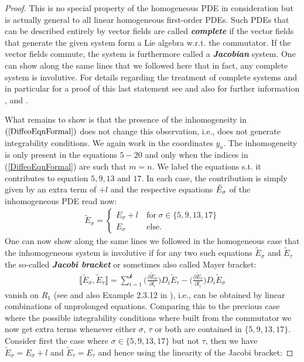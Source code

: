 \begin{proof}
This is no special property of the homogeneous PDE in consideration but is actually general to all linear homogeneous first-order PDEs. Such PDEs that can be described entirely by vector fields are called \textit{\textbf{complete}} if the vector fields that generate the given system form a Lie algebra w.r.t. the commutator. If the vector fields commute, the system is furthermore called a \textit{\textbf{Jacobian}} system. One can show along the same lines that we followed here that in fact, any complete system is involutive. For details regarding the treatment of complete systems and in particular for a proof of this last statement see \cite{seiler1994analysis} and also for further information \cite{Clebsch1866}, \cite{caratheodory1956variationsrechnung} and \cite{lie1970theorie}.

What remains to show is that the presence of the inhomogeneity in $(\ref{DiffeoEqnFormal})$ does not change this observation, i.e., does not generate integrability conditions. We again work in the coordinates $y_a$. The inhomogeneity is only present in the equations $5-20$ and only when the indices in (\ref{DiffeoEqnFormal}) are such that $m = n$. We label the equations s.t. it contributes to equation $5,9,13$ and $17$. In each case, the contribution is simply given by an extra term of $+l$ and the respective equations $\Tilde{E}_{\sigma}$ of the inhomogeneous PDE read now: 
\begin{align}
     \tilde{E}_{\sigma} = \begin{cases}
     E_{\sigma} + l \ &\text{for} \ \sigma \in \{ 5,9,13,17 \}\\
     E_{\sigma} \ &\text{else}.
     \end{cases}
\end{align}
One can now show along the same lines we followed in the homogeneous case that the inhomogeneous system is involutive if for any two such equations $\tilde{E}_{\sigma}$ and $\tilde{E}_{\tau}$ the so-called \textit{\textbf{Jacobi bracket}} or sometimes also called Mayer bracket: 
\begin{align}
  \llbracket \tilde{E}_{\sigma}, \tilde{E}_{\tau} \rrbracket = \sum _{i = 1}^{\mathcal{k}} \biggl(\frac{\partial \tilde{E}_{\sigma}}{\partial l_i}\biggr) D_{i}\tilde{E}_{\tau} -  \biggl(\frac{\partial \tilde{E}_{\tau}}{\partial l_i}\biggr) D_{i}\tilde{E}_{\sigma} 
\end{align}
vanish on $R_1$ (see  \cite{seiler1994analysis} and also Example 2.3.12 in \cite{seiler2009involution}), i.e., can be obtained by linear combinations of unprolonged equations. Comparing this to the previous case where the possible integrability conditions where built from the commutator we now get extra terms whenever either $\sigma$, $\tau$ or both are contained in $\{ 5,9,13,17 \}$. Consider first the case where $\sigma \in \{5,9,13,17\}$ but not $\tau$, then we have $\tilde{E}_{\sigma} = E_{\sigma} + l$ and $\tilde{E}_{\tau} = E_{\tau}$ and hence using the linearity of the Jacobi bracket:

\end{proof}
